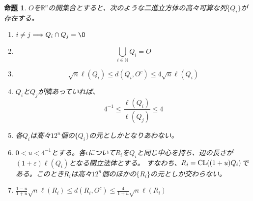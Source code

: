 \documentclass[leqno]{jsarticle}
\newtheorem{prop}[thm]{命題}
\newcommand{\To}{\Longrightarrow}
\newcommand{\nn}{\mathbb{N}}
\newcommand{\rr}{\mathbb{R}}
\newcommand{\ep}{\varepsilon}
\newcommand{\cl}{\text{{\rm CL}}}
\begin{document}
\begin{prop}\label{daiji}
$O$を$\rr^n$の開集合とすると、次のような二進立方体の高々可算な列$\{Q_i\}$が存在する。
\begin{enumerate}
\item $i\neq j\To Q_i\cap Q_j=\O$
\item 
\[
\bigcup_{i\in \nn}Q_i=O
\]
\item 
\[
\sqrt{n}\ell(Q_i)\le d(Q_i, O^c)\le 4\sqrt{n}\ell(Q_i)
\]
\item $Q_i$と$Q_j$が隣あっていれば、
\[
4^{-1}\le \frac{\ell(Q_i)}{\ell(Q_j)}\le 4
\]
\item 各$Q_i$は高々$12^n$個の$\{Q_i\}$の元としかとなりあわない。
\item $0<u<4^{-1}$とする。各$i$について$R_i$を$Q_i$と同じ中心を持ち、辺の長さが$(1+\ep)\ell(Q_i)$となる閉立法体とする。
すなわち、$R_i=\cl((1+u)Q_i)$である。このとき$R_i$は高々$12^n$個のほかの$\{R_i\}$の元としか交わらない。
\item $\frac{1-u}{1+u}\sqrt{n}\ell(R_i)\le d(R_i,O^c)\le \frac{4}{1+u}\sqrt{n}\ell(R_i)$
\end{enumerate}
\end{prop}
\end{document}
